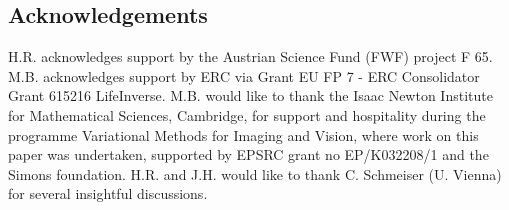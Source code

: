 \documentclass{article}
\numberwithin{equation}{section}
\newcommand{\helene}[1]{\todo[inline,color=blue!40]{Helene: #1}}
\def\comment#1{\textcolor{blue}{\bf [Jan: #1]}}
\begin{document}
%
%
%
%

\subsection*{Acknowledgements}
H.R. acknowledges support by the Austrian Science Fund (FWF) project F 65.
M.B. acknowledges support by ERC via Grant EU FP 7 - ERC Consolidator
Grant 615216 LifeInverse. M.B. would like to thank the Isaac Newton Institute for
Mathematical Sciences, Cambridge, for support and hospitality during the programme Variational
Methods for Imaging and Vision, where work on this paper was undertaken, supported
by EPSRC grant no EP/K032208/1 and the Simons foundation.
H.R. and J.H. would like to thank C. Schmeiser (U. Vienna) for several insightful discussions.




\end{document}
